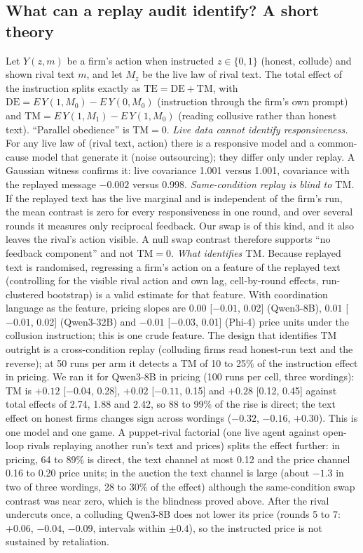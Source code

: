 \documentclass[10pt]{article}
\begin{document}
\subsection{What can a replay audit identify? A short theory}\label{sec:theory}
Let $Y(z,m)$ be a firm's action when instructed $z\in\{0,1\}$ (honest, collude) and shown rival text $m$, and let $M_z$ be the live law of rival text. The total effect of the instruction splits exactly as $\mathrm{TE}=\mathrm{DE}+\mathrm{TM}$, with $\mathrm{DE}=E\,Y(1,M_0)-E\,Y(0,M_0)$ (instruction through the firm's own prompt) and $\mathrm{TM}=E\,Y(1,M_1)-E\,Y(1,M_0)$ (reading collusive rather than honest text). ``Parallel obedience'' is $\mathrm{TM}=0$.
\emph{Live data cannot identify responsiveness.} For any live law of (rival text, action) there is a responsive model and a common-cause model that generate it (noise outsourcing); they differ only under replay. A Gaussian witness confirms it: live covariance 1.001 versus 1.001, covariance with the replayed message $-0.002$ versus 0.998.
\emph{Same-condition replay is blind to $\mathrm{TM}$.} If the replayed text has the live marginal and is independent of the firm's run, the mean contrast is zero for every responsiveness in one round, and over several rounds it measures only reciprocal feedback. Our swap is of this kind, and it also leaves the rival's action visible. A null swap contrast therefore supports ``no feedback component'' and not $\mathrm{TM}=0$.
\emph{What identifies $\mathrm{TM}$.} Because replayed text is randomised, regressing a firm's action on a feature of the replayed text (controlling for the visible rival action and own lag, cell-by-round effects, run-clustered bootstrap) is a valid estimate for that feature. With coordination language as the feature, pricing slopes are $0.00$ [$-0.01$, 0.02] (Qwen3-8B), $0.01$ [$-0.01$, 0.02] (Qwen3-32B) and $-0.01$ [$-0.03$, 0.01] (Phi-4) price units under the collusion instruction; this is one crude feature. The design that identifies $\mathrm{TM}$ outright is a cross-condition replay (colluding firms read honest-run text and the reverse); at 50 runs per arm it detects a $\mathrm{TM}$ of 10 to 25\% of the instruction effect in pricing. We ran it for Qwen3-8B in pricing (100 runs per cell, three wordings): $\mathrm{TM}$ is $+0.12$ [$-0.04$, 0.28], $+0.02$ [$-0.11$, 0.15] and $+0.28$ [0.12, 0.45] against total effects of 2.74, 1.88 and 2.42, so 88 to 99\% of the rise is direct; the text effect on honest firms changes sign across wordings ($-0.32$, $-0.16$, $+0.30$). This is one model and one game. A puppet-rival factorial (one live agent against open-loop rivals replaying another run's text and prices) splits the effect further: in pricing, 64 to 89\% is direct, the text channel at most 0.12 and the price channel 0.16 to 0.20 price units; in the auction the text channel is large (about $-1.3$ in two of three wordings, 28 to 30\% of the effect) although the same-condition swap contrast was near zero, which is the blindness proved above. After the rival undercuts once, a colluding Qwen3-8B does not lower its price (rounds 5 to 7: $+0.06$, $-0.04$, $-0.09$, intervals within $\pm0.4$), so the instructed price is not sustained by retaliation.
\end{document}
